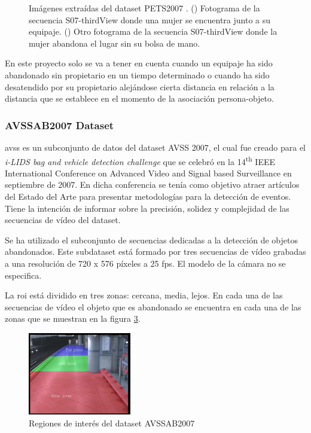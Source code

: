 \begin{figure}[ht]
\begin{subfigure}[b]{0.4\textwidth}
    \caption{}
    \label{fig:pets2007_4}
  \end{subfigure}
  \caption{Imágenes extraídas del dataset PETS2007 \cite{pets2007-dataset}.
    (\protect{}) Fotograma de la secuencia S07-thirdView donde una mujer se encuentra junto a su equipaje.
    (\protect{}) Otro fotograma de la secuencia S07-thirdView donde la mujer abandona el lugar sin su bolsa de mano.}
  \label{fig:pets2007_S07}
\end{figure}

En este proyecto solo se va a tener en cuenta cuando un equipaje ha sido abandonado sin propietario en un tiempo determinado o cuando ha sido desatendido por su propietario alejándose cierta distancia en relación a la distancia que se establece en el momento de la asociación persona-objeto.

\subsubsection{AVSSAB2007 Dataset}

\gls{avss} \cite{AVSSAB2007-dataset} es un subconjunto de datos del dataset AVSS 2007, el cual fue creado para el \textit{i-LIDS bag and vehicle detection challenge} que se celebró en la 14\textsuperscript{th} IEEE International Conference on Advanced Video and Signal based Surveillance en septiembre de 2007. En dicha conferencia se tenía como objetivo atraer artículos del Estado del Arte para presentar metodologías para la detección de eventos. Tiene la intención de informar sobre la precisión, solidez y complejidad de las secuencias de vídeo del dataset.

Se ha utilizado el subconjunto de secuencias dedicadas a la detección de objetos abandonados. Este subdataset está formado por tres secuencias de vídeo grabadas a una resolución de 720 x 576 píxeles a 25 \gls{fps}. El modelo de la cámara no se especifica.

La \gls{roi} está dividido en tres zonas: cercana, media, lejos. En cada una de las secuencias de vídeo el objeto que es abandonado se encuentra en cada una de las zonas que se muestran en la figura \ref{fig:avssab2007-zones}.

\begin{figure}[ht]
\centering
\includegraphics[width=0.4\textwidth]{img/chapters/resultados/datasets/avssab2007-zones.png}
\caption{\label{fig:avssab2007-zones}Regiones de interés del dataset AVSSAB2007 \cite{AVSSAB2007-dataset}}
\end{figure}

